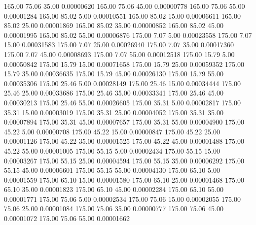     165.00     75.06     35.00     0.00000620
    165.00     75.06     45.00     0.00000778
    165.00     75.06     55.00     0.00001284
    165.00     85.02      5.00     0.00010551
    165.00     85.02     15.00     0.00006611
    165.00     85.02     25.00     0.00001869
    165.00     85.02     35.00     0.00000852
    165.00     85.02     45.00     0.00001995
    165.00     85.02     55.00     0.00006876
    175.00      7.07      5.00     0.00023558
    175.00      7.07     15.00     0.00031583
    175.00      7.07     25.00     0.00026940
    175.00      7.07     35.00     0.00017360
    175.00      7.07     45.00     0.00008693
    175.00      7.07     55.00     0.00012518
    175.00     15.79      5.00     0.00050842
    175.00     15.79     15.00     0.00071658
    175.00     15.79     25.00     0.00059352
    175.00     15.79     35.00     0.00036635
    175.00     15.79     45.00     0.00026130
    175.00     15.79     55.00     0.00035306
    175.00     25.46      5.00     0.00028149
    175.00     25.46     15.00     0.00034444
    175.00     25.46     25.00     0.00033686
    175.00     25.46     35.00     0.00033341
    175.00     25.46     45.00     0.00030213
    175.00     25.46     55.00     0.00026605
    175.00     35.31      5.00     0.00002817
    175.00     35.31     15.00     0.00003019
    175.00     35.31     25.00     0.00004052
    175.00     35.31     35.00     0.00007894
    175.00     35.31     45.00     0.00007657
    175.00     35.31     55.00     0.00004900
    175.00     45.22      5.00     0.00000708
    175.00     45.22     15.00     0.00000847
    175.00     45.22     25.00     0.00001126
    175.00     45.22     35.00     0.00001525
    175.00     45.22     45.00     0.00001488
    175.00     45.22     55.00     0.00001005
    175.00     55.15      5.00     0.00002434
    175.00     55.15     15.00     0.00003267
    175.00     55.15     25.00     0.00004594
    175.00     55.15     35.00     0.00006292
    175.00     55.15     45.00     0.00006601
    175.00     55.15     55.00     0.00004130
    175.00     65.10      5.00     0.00001559
    175.00     65.10     15.00     0.00001580
    175.00     65.10     25.00     0.00001468
    175.00     65.10     35.00     0.00001823
    175.00     65.10     45.00     0.00002284
    175.00     65.10     55.00     0.00001771
    175.00     75.06      5.00     0.00002534
    175.00     75.06     15.00     0.00002055
    175.00     75.06     25.00     0.00001084
    175.00     75.06     35.00     0.00000777
    175.00     75.06     45.00     0.00001072
    175.00     75.06     55.00     0.00001662

